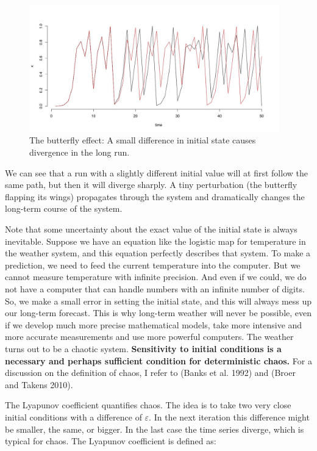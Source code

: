 \documentclass[
  letterpaper,
]{scrbook}
\begin{document}
\begin{figure}

{\centering \includegraphics[width=4.26783in,height=2.16514in]{media/ch2/image6.jpg}

}

\caption{\label{fig-ch2-img6}The butterfly effect: A small difference in
initial state causes divergence in the long run.}

\end{figure}

We can see that a run with a slightly different initial value will at
first follow the same path, but then it will diverge sharply. A tiny
perturbation (the butterfly flapping its wings) propagates through the
system and dramatically changes the long-term course of the system.

Note that some uncertainty about the exact value of the initial state is
always inevitable. Suppose we have an equation like the logistic map for
temperature in the weather system, and this equation perfectly describes
that system. To make a prediction, we need to feed the current
temperature into the computer. But we cannot measure temperature with
infinite precision. And even if we could, we do not have a computer that
can handle numbers with an infinite number of digits. So, we make a
small error in setting the initial state, and this will always mess up
our long-term forecast. This is why long-term weather will never be
possible, even if we develop much more precise mathematical models, take
more intensive and more accurate measurements and use more powerful
computers. The weather turns out to be a chaotic system.
\textbf{Sensitivity to initial conditions is a necessary and perhaps
sufficient condition for deterministic chaos.} For a discussion on the
definition of chaos, I refer to (Banks et al. 1992) and (Broer and
Takens 2010).

The Lyapunov coefficient quantifies chaos. The idea is to take two very
close initial conditions with a difference of \(\varepsilon\). In the
next iteration this difference might be smaller, the same, or bigger. In
the last case the time series diverge, which is typical for chaos. The
Lyapunov coefficient is defined as:
\end{document}

